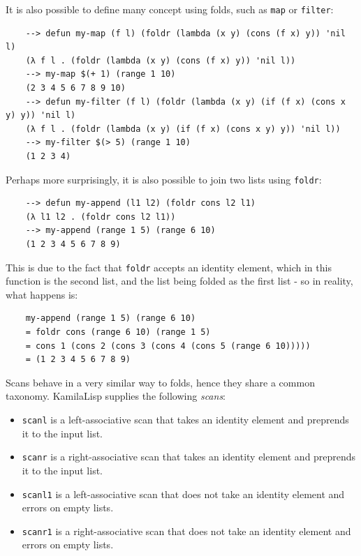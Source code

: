 It is also possible to define many concept using folds, such as \verb|map| or \verb|filter|:

\begin{Verbatim}
    --> defun my-map (f l) (foldr (lambda (x y) (cons (f x) y)) 'nil l)
    (λ f l . (foldr (lambda (x y) (cons (f x) y)) 'nil l))
    --> my-map $(+ 1) (range 1 10)
    (2 3 4 5 6 7 8 9 10)
    --> defun my-filter (f l) (foldr (lambda (x y) (if (f x) (cons x y) y)) 'nil l)
    (λ f l . (foldr (lambda (x y) (if (f x) (cons x y) y)) 'nil l))
    --> my-filter $(> 5) (range 1 10)
    (1 2 3 4)
\end{Verbatim}

Perhaps more surprisingly, it is also possible to join two lists using \verb|foldr|:

\begin{Verbatim}
    --> defun my-append (l1 l2) (foldr cons l2 l1)
    (λ l1 l2 . (foldr cons l2 l1))
    --> my-append (range 1 5) (range 6 10)
    (1 2 3 4 5 6 7 8 9)
\end{Verbatim}

This is due to the fact that \verb|foldr| accepts an identity element, which in this function is the second list, and the list being folded as the first list - so in reality, what happens is:

\begin{Verbatim}
    my-append (range 1 5) (range 6 10)
    = foldr cons (range 6 10) (range 1 5)
    = cons 1 (cons 2 (cons 3 (cons 4 (cons 5 (range 6 10)))))
    = (1 2 3 4 5 6 7 8 9)
\end{Verbatim}

Scans behave in a very similar way to folds, hence they share a common taxonomy. KamilaLisp supplies the following \textit{scans}:

\begin{itemize}
    \item \verb|scanl| is a left-associative scan that takes an identity element and preprends it to the input list.
    \item \verb|scanr| is a right-associative scan that takes an identity element and preprends it to the input list.
    \item \verb|scanl1| is a left-associative scan that does not take an identity element and errors on empty lists.
    \item \verb|scanr1| is a right-associative scan that does not take an identity element and errors on empty lists.
\end{itemize}

